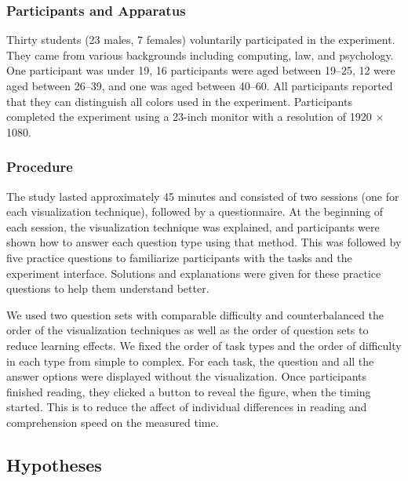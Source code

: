 \subsubsection{Participants and Apparatus} Thirty students (23 males, 7 females) voluntarily participated in the experiment. They came from various backgrounds including computing, law, and psychology. One participant was under 19, 16 participants were aged between 19--25, 12 were aged between 26--39, and one was aged between 40--60. All participants reported that they can distinguish all colors used in the experiment. Participants completed the experiment using a 23-inch monitor with a resolution of 1920 $\times$ 1080.

\subsubsection{Procedure} The study lasted approximately 45 minutes and consisted of two sessions (one for each visualization technique), followed by a questionnaire. At the beginning of each session, the visualization technique was explained, and participants were shown how to answer each question type using that method. This was followed by five practice questions to familiarize participants with the tasks and the experiment interface. Solutions and explanations were given for these practice questions to help them understand better.

We used two question sets with comparable difficulty and counterbalanced the order of the visualization techniques as well as the order of question sets to reduce learning effects. We fixed the order of task types and the order of difficulty in each type from simple to complex. For each task, the question and all the answer options were displayed without the visualization. Once participants finished reading, they clicked a button to reveal the figure, when the timing started. This is to reduce the affect of individual differences in reading and comprehension speed on the measured time. 

\subsection{Hypotheses}

